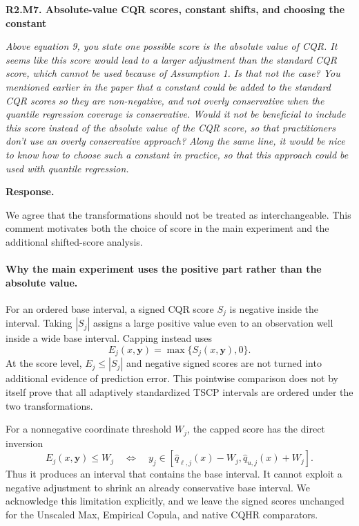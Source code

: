 \documentclass[11pt]{article}
\numberwithin{equation}{section}
\newcommand{\reviewercomment}[2]{%
  \par\medskip\noindent\textbf{#1}\par\nopagebreak
  \begingroup\color{ReviewerBlue}\itshape #2\par\endgroup
  \noindent\textbf{Response.} }
\begin{document}
\reviewercomment{R2.M7. Absolute-value CQR scores, constant shifts, and choosing the constant}{%
Above equation 9, you state one possible score is the absolute value
of CQR. It seems like this score would lead to a larger adjustment
than the standard CQR score, which cannot be used because of
Assumption 1. Is that not the case? You mentioned earlier in the
paper that a constant could be added to the standard CQR scores so
they are non-negative, and not overly conservative when the
quantile regression coverage is conservative. Would it not be
beneficial to include this score instead of the absolute value of
the CQR score, so that practitioners don't use an overly
conservative approach? Along the same line, it would be nice to
know how to choose such a constant in practice, so that this
approach could be used with quantile regression.}

We agree that the transformations should not be treated as
interchangeable. This comment motivates both the choice of score in
the main experiment and the additional shifted-score analysis.

\paragraph{Why the main experiment uses the positive part rather than
the absolute value.}
For an ordered base interval, a signed CQR score $S_j$ is negative
inside the interval. Taking $|S_j|$ assigns a large positive value
even to an observation well inside a wide base interval. Capping
instead uses
\begin{equation}
 E_j(x,\bm y)=\max\{S_j(x,\bm y),0\}.
 \label{eq:capped-score}
\end{equation}
At the score level, $E_j\leq|S_j|$ and negative signed scores are
not turned into additional evidence of prediction error. This
pointwise comparison does not by itself prove that all adaptively
standardized TSCP intervals are ordered under the two transformations.

For a nonnegative coordinate threshold $W_j$, the capped score has
the direct inversion
\begin{equation}
 E_j(x,\bm y)\leq W_j
 \quad\Longleftrightarrow\quad
 y_j\in[\widehat q_{\ell,j}(x)-W_j,
        \widehat q_{u,j}(x)+W_j].
 \label{eq:capped-inversion}
\end{equation}
Thus it produces an interval that contains the base interval. It
cannot exploit a negative adjustment to shrink an already
conservative base interval. We acknowledge this limitation explicitly,
and we leave the signed scores unchanged for the Unscaled Max,
Empirical Copula, and native CQHR comparators.
\end{document}
